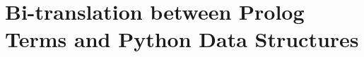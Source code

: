 
%
%


\section{Bi-translation between Prolog Terms and Python Data Structures} \label{sec:jns-bi-translation}

